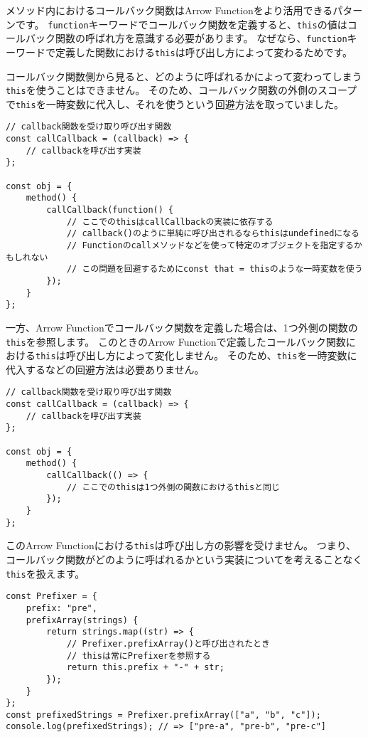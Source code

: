 メソッド内におけるコールバック関数はArrow
Functionをより活用できるパターンです。
\texttt{function}キーワードでコールバック関数を定義すると、\texttt{this}の値はコールバック関数の呼ばれ方を意識する必要があります。
なぜなら、\texttt{function}キーワードで定義した関数における\texttt{this}は呼び出し方によって変わるためです。

コールバック関数側から見ると、どのように呼ばれるかによって変わってしまう\texttt{this}を使うことはできません。
そのため、コールバック関数の外側のスコープで\texttt{this}を一時変数に代入し、それを使うという回避方法を取っていました。

\begin{lstlisting}
// callback関数を受け取り呼び出す関数
const callCallback = (callback) => {
    // callbackを呼び出す実装
};

const obj = {
    method() {
        callCallback(function() {
            // ここでのthisはcallCallbackの実装に依存する
            // callback()のように単純に呼び出されるならthisはundefinedになる
            // Functionのcallメソッドなどを使って特定のオブジェクトを指定するかもしれない
            // この問題を回避するためにconst that = thisのような一時変数を使う
        });
    }
};
\end{lstlisting}

一方、Arrow
Functionでコールバック関数を定義した場合は、1つ外側の関数の\texttt{this}を参照します。
このときのArrow
Functionで定義したコールバック関数における\texttt{this}は呼び出し方によって変化しません。
そのため、\texttt{this}を一時変数に代入するなどの回避方法は必要ありません。

\begin{lstlisting}
// callback関数を受け取り呼び出す関数
const callCallback = (callback) => {
    // callbackを呼び出す実装
};

const obj = {
    method() {
        callCallback(() => {
            // ここでのthisは1つ外側の関数におけるthisと同じ
        });
    }
};
\end{lstlisting}

このArrow
Functionにおける\texttt{this}は呼び出し方の影響を受けません。
つまり、コールバック関数がどのように呼ばれるかという実装についてを考えることなく\texttt{this}を扱えます。

\begin{lstlisting}
const Prefixer = {
    prefix: "pre",
    prefixArray(strings) {
        return strings.map((str) => {
            // Prefixer.prefixArray()と呼び出されたとき
            // thisは常にPrefixerを参照する
            return this.prefix + "-" + str;
        });
    }
};
const prefixedStrings = Prefixer.prefixArray(["a", "b", "c"]);
console.log(prefixedStrings); // => ["pre-a", "pre-b", "pre-c"]
\end{lstlisting}

